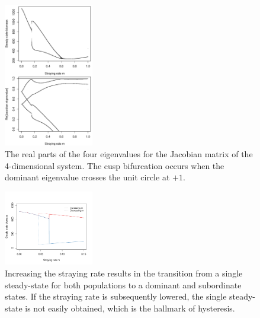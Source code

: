\documentclass{revtex4}
\begin{document}
\begin{figure}
  \captionsetup{justification=raggedright,
singlelinecheck=false
}
\centering
\includegraphics[width=0.35\textwidth]{fig_eigs.pdf}
\caption{
The real parts of the four eigenvalues for the Jacobian matrix of the 4-dimensional system.
The cusp bifurcation occurs when the dominant eigenvalue crosses the unit circle at $+1$. 
} \label{fig:eigs}
\end{figure}


\begin{figure}
  \captionsetup{justification=raggedright,
singlelinecheck=false
}
\centering
\includegraphics[width=0.35\textwidth]{fig_hysteresis.pdf}
\caption{
Increasing the straying rate results in the transition from a single steady-state for both populations to a dominant and subordinate states. If the straying rate is subsequently lowered, the single steady-state is not easily obtained, which is the hallmark of hysteresis.
} \label{fig:hysteresis}
\end{figure}
\end{document}
